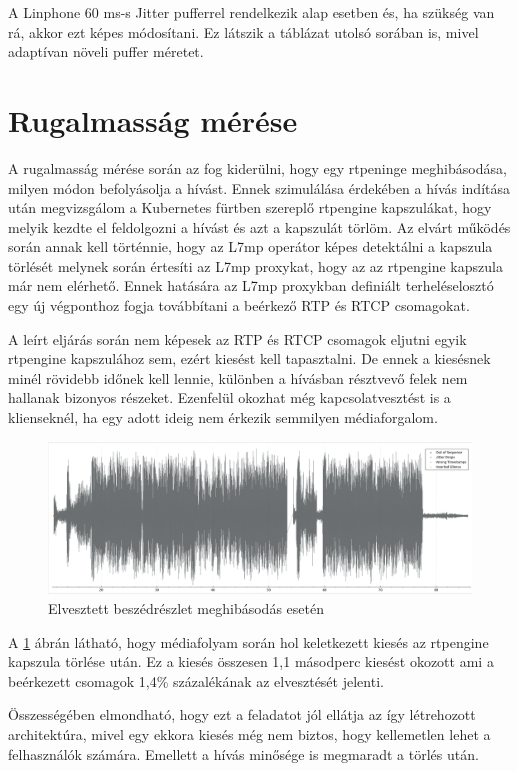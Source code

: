 A Linphone 60 ms-s Jitter pufferrel rendelkezik alap esetben és, ha szükség van rá, akkor 
ezt képes módosítani. Ez látszik a táblázat utolsó sorában is, mivel adaptívan növeli 
puffer méretet.

\section{Rugalmasság mérése}

A rugalmasság mérése során az fog kiderülni, hogy egy rtpeninge meghibásodása, milyen 
módon befolyásolja a hívást. Ennek szimulálása érdekében a hívás indítása után 
megvizsgálom a Kubernetes fürtben szereplő rtpengine kapszulákat, hogy melyik kezdte 
el feldolgozni a hívást és azt a kapszulát törlöm. Az elvárt működés során annak kell 
történnie, hogy az L7mp operátor képes detektálni a kapszula törlését melynek során 
értesíti az L7mp proxykat, hogy az az rtpengine kapszula már nem elérhető. Ennek hatására 
az L7mp proxykban definiált terheléselosztó egy új végponthoz fogja továbbítani a 
beérkező RTP és RTCP csomagokat. 

A leírt eljárás során nem képesek az RTP és RTCP csomagok eljutni egyik rtpengine 
kapszulához sem, ezért kiesést kell tapasztalni. De ennek a kiesésnek minél rövidebb 
időnek kell lennie, különben a hívásban résztvevő felek nem hallanak bizonyos részeket. 
Ezenfelül okozhat még kapcsolatvesztést is a klienseknél, ha egy adott ideig nem érkezik 
semmilyen médiaforgalom. 

\begin{figure}[!ht]
	\centering
	\includegraphics[width=1\textwidth, keepaspectratio]{figures/res.png}
	\caption{Elvesztett beszédrészlet meghibásodás esetén}
	\label{fig:res}
\end{figure}

A \ref{fig:res} ábrán látható, hogy médiafolyam során hol keletkezett kiesés az rtpengine kapszula törlése után. Ez a kiesés összesen 1,1 másodperc kiesést okozott ami a beérkezett csomagok 1,4\% százalékának az elvesztését jelenti.

Összességében elmondható, hogy ezt a feladatot jól ellátja az így létrehozott architektúra, mivel egy ekkora kiesés még nem biztos, hogy kellemetlen lehet a felhasználók számára. Emellett a hívás minősége is megmaradt a törlés után. 
